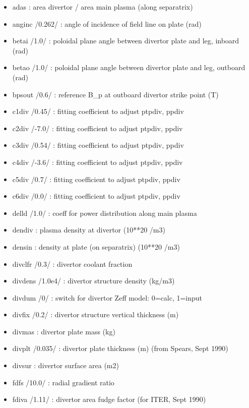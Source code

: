 \documentclass[]{article}
\providecommand{\tightlist}{%
  \setlength{\itemsep}{0pt}\setlength{\parskip}{0pt}}
\begin{document}
\begin{itemize}
  \begin{itemize}
  \tightlist
  \item
    adas : area divertor / area main plasma (along separatrix)
  \item
    anginc /0.262/ : angle of incidence of field line on plate (rad)
  \item
    betai /1.0/ : poloidal plane angle between divertor plate and leg,
    inboard (rad)
  \item
    betao /1.0/ : poloidal plane angle between divertor plate and leg,
    outboard (rad)
  \item
    bpsout /0.6/ : reference B\_p at outboard divertor strike point (T)
  \item
    c1div /0.45/ : fitting coefficient to adjust ptpdiv, ppdiv
  \item
    c2div /-7.0/ : fitting coefficient to adjust ptpdiv, ppdiv
  \item
    c3div /0.54/ : fitting coefficient to adjust ptpdiv, ppdiv
  \item
    c4div /-3.6/ : fitting coefficient to adjust ptpdiv, ppdiv
  \item
    c5div /0.7/ : fitting coefficient to adjust ptpdiv, ppdiv
  \item
    c6div /0.0/ : fitting coefficient to adjust ptpdiv, ppdiv
  \item
    delld /1.0/ : coeff for power distribution along main plasma
  \item
    dendiv : plasma density at divertor (10**20 /m3)
  \item
    densin : density at plate (on separatrix) (10**20 /m3)
  \item
    divclfr /0.3/ : divertor coolant fraction
  \item
    divdens /1.0e4/ : divertor structure density (kg/m3)
  \item
    divdum /0/ : switch for divertor Zeff model: 0=calc, 1=input
  \item
    divfix /0.2/ : divertor structure vertical thickness (m)
  \item
    divmas : divertor plate mass (kg)
  \item
    divplt /0.035/ : divertor plate thickness (m) (from Spears, Sept
    1990)
  \item
    divsur : divertor surface area (m2)
  \item
    fdfs /10.0/ : radial gradient ratio
  \item
    fdiva /1.11/ : divertor area fudge factor (for ITER, Sept 1990)

\end{itemize}
\end{itemize}
\end{document}
